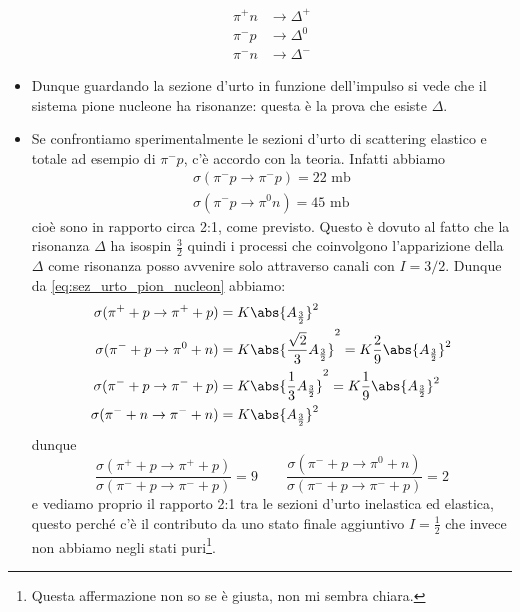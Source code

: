 \begin{itemize}
\begin{align*}
    \pi^+n&\to\Delta^+\\
    \pi^-p&\to\Delta^0\\
    \pi^-n&\to\Delta^-
\end{align*}
\item Dunque guardando la sezione d'urto in funzione dell'impulso si vede che il sistema pione nucleone ha risonanze: questa è la prova che esiste $\Delta$. 
\item Se confrontiamo sperimentalmente le sezioni d'urto di scattering elastico e totale ad esempio di $\pi^-p$, c'è accordo con la teoria. Infatti abbiamo
\begin{gather*}
    \sigma(\pi^-p\to\pi^-p)=22\text{ mb}\\
    \sigma(\pi^-p\to\pi^0n)=45\text{ mb}
\end{gather*}
cioè sono in rapporto circa 2:1, come previsto. Questo è dovuto al fatto che la risonanza $\Delta$ ha isospin $\frac32$ quindi i processi che coinvolgono l'apparizione della $\Delta$ come risonanza posso avvenire solo attraverso canali con $I=3/2$. Dunque da \eqref{eq:sez_urto_pion_nucleon} abbiamo:
    \begin{align*}
        \sigma(\pi^++p\to\pi^++p)&=K\abs{A_{\frac32}}^2\\
        \sigma(\pi^-+p\to\pi^0+n)&=K\abs{\frac{\sqrt2}3 A_{\frac32}}^2=K\frac29\abs{A_{\frac32}}^2\\
        \sigma(\pi^-+p\to\pi^-+p)&=K\abs{\frac13 A_{\frac32}}^2=K\frac19\abs{A_{\frac32}}^2\\
        \sigma(\pi^-+n\to\pi^-+n)&=K\abs{A_{\frac32}}^2
        \end{align*}
        dunque
        \begin{equation*}
            \frac{\sigma(\pi^++p\to\pi^++p)}{\sigma(\pi^-+p\to\pi^-+p)}=9\qquad\frac{\sigma(\pi^-+p\to\pi^0+n)}{\sigma(\pi^-+p\to\pi^-+p)}=2
        \end{equation*}
        e vediamo proprio il rapporto 2:1 tra le sezioni d'urto inelastica ed elastica, questo perché c'è il contributo da uno stato finale aggiuntivo $I=\frac12$ che invece non abbiamo negli stati puri\footnote{Questa affermazione non so se è giusta, non mi sembra chiara.}.
\end{itemize}